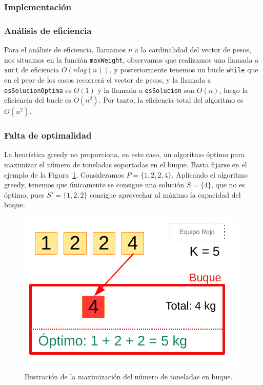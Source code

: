 \subsubsection{Implementación}



\subsubsection{Análisis de eficiencia}

Para el análisis de eficiencia, llamamos $n$ a la cardinalidad del vector de pesos, nos situamos en la función \texttt{maxWeight}, observamos que realizamos una llamada a \texttt{sort} de eficiencia $O(nlog(n))$, y posteriormente tenemos un bucle \texttt{while} que en el peor de los casos recorrerá el vector de pesos, y la llamada a \texttt{esSolucionOptima} es $O(1)$ y la llamada a \texttt{esSolucion} son $O(n)$, luego la eficiencia del bucle es $O(n^2)$. Por tanto, la eficiencia total del algoritmo es $O(n^2)$.

\subsubsection{Falta de optimalidad}

La heurística greedy no proporciona, en este caso, un algoritmo óptimo para maximizar el número de 
toneladas soportadas en el buque. Basta fijarse en el ejemplo de la Figura~\ref{fig:dib2}. Consideramos
$P = \{1,2,2,4\}$. Aplicando el algoritmo greedy, tenemos que únicamente se consigue
una solución $S = \{4\}$, que no es óptimo, pues $S' = \{1,2,2\}$ consigue aprovechar
al máximo la capacidad del buque. 

\begin{figure}[H] 
    \centering
    \includegraphics[scale=1]{img/DibCont2.pdf}
    \caption{Ilustración de la maximización del número de toneladas en buque.}
    \label{fig:dib2}
\end{figure}